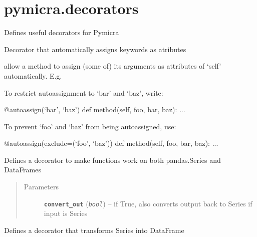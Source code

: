 \documentclass[a4paper,10pt,oneside]{sphinxmanual}
\begin{document}
\section{pymicra.decorators}
\label{pymicra:pymicra-decorators}\label{pymicra:module-pymicra.decorators}
Defines useful decorators for Pymicra

\begin{fulllineitems}
\label{pymicra:pymicra.decorators.autoassign}
Decorator that automatically assigns keywords as atributes

allow a method to assign (some of) its arguments as attributes of
`self' automatically.  E.g.

To restrict autoassignment to `bar' and `baz', write:

@autoassign(`bar', `baz')
def method(self, foo, bar, baz): ...

To prevent `foo' and `baz' from being autoassigned, use:

@autoassign(exclude=(`foo', `baz'))
def method(self, foo, bar, baz): ...

\end{fulllineitems}


\begin{fulllineitems}
\label{pymicra:pymicra.decorators.pdgeneral}
Defines a decorator to make functions work on both pandas.Series and DataFrames
\begin{quote}\begin{description}
\item[{Parameters}] \leavevmode
\textbf{\texttt{convert\_out}} (\emph{\texttt{bool}}) -- if True, also converts output back to Series if input is Series

\end{description}\end{quote}

\end{fulllineitems}


\begin{fulllineitems}
\label{pymicra:pymicra.decorators.pdgeneral_in}
Defines a decorator that transforms Series into DataFrame

\end{fulllineitems}
\end{document}
